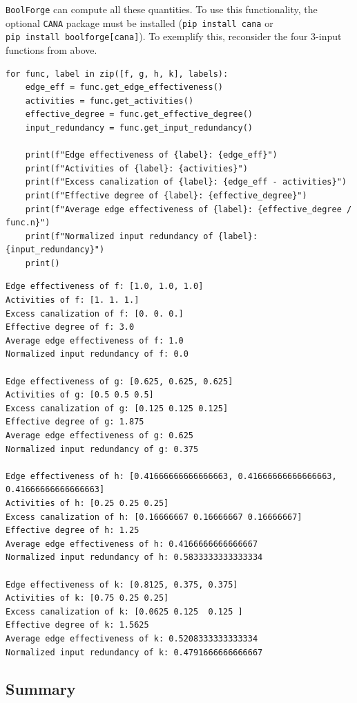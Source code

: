 \documentclass[
]{article}
\begin{document}
\texttt{BoolForge} can compute all these quantities. To use this
functionality, the optional \texttt{CANA} package must be installed
(\texttt{pip\ install\ cana} or
\texttt{pip\ install\ boolforge{[}cana{]}}). To exemplify this,
reconsider the four 3-input functions from above.

\begin{lstlisting}
for func, label in zip([f, g, h, k], labels):
    edge_eff = func.get_edge_effectiveness()
    activities = func.get_activities()
    effective_degree = func.get_effective_degree()
    input_redundancy = func.get_input_redundancy()

    print(f"Edge effectiveness of {label}: {edge_eff}")
    print(f"Activities of {label}: {activities}")
    print(f"Excess canalization of {label}: {edge_eff - activities}")
    print(f"Effective degree of {label}: {effective_degree}")
    print(f"Average edge effectiveness of {label}: {effective_degree / func.n}")
    print(f"Normalized input redundancy of {label}: {input_redundancy}")
    print()
\end{lstlisting}

\begin{lstlisting}
Edge effectiveness of f: [1.0, 1.0, 1.0]
Activities of f: [1. 1. 1.]
Excess canalization of f: [0. 0. 0.]
Effective degree of f: 3.0
Average edge effectiveness of f: 1.0
Normalized input redundancy of f: 0.0

Edge effectiveness of g: [0.625, 0.625, 0.625]
Activities of g: [0.5 0.5 0.5]
Excess canalization of g: [0.125 0.125 0.125]
Effective degree of g: 1.875
Average edge effectiveness of g: 0.625
Normalized input redundancy of g: 0.375

Edge effectiveness of h: [0.41666666666666663, 0.41666666666666663, 0.41666666666666663]
Activities of h: [0.25 0.25 0.25]
Excess canalization of h: [0.16666667 0.16666667 0.16666667]
Effective degree of h: 1.25
Average edge effectiveness of h: 0.4166666666666667
Normalized input redundancy of h: 0.5833333333333334

Edge effectiveness of k: [0.8125, 0.375, 0.375]
Activities of k: [0.75 0.25 0.25]
Excess canalization of k: [0.0625 0.125  0.125 ]
Effective degree of k: 1.5625
Average edge effectiveness of k: 0.5208333333333334
Normalized input redundancy of k: 0.4791666666666667
\end{lstlisting}

\subsection{Summary}\label{summary-2}
\end{document}
